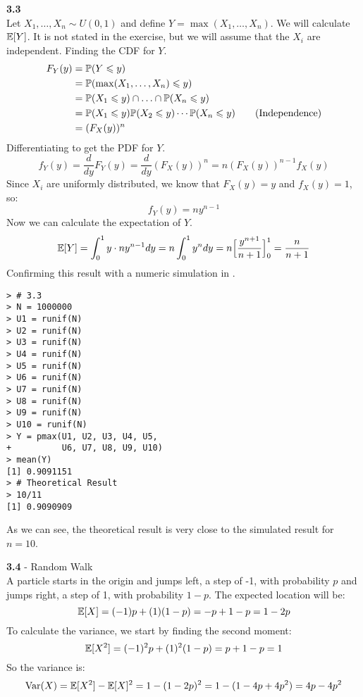 \newpage\noindent
\textbf{3.3}\\  %
Let $X_1,\ldots, X_n\sim U(0,1)$ and define $Y = \max(X_1,\ldots, X_n)$. We will calculate
$\E[Y]$. It is not stated in the exercise, but we will assume that the $X_i$ are independent.
Finding the CDF for $Y$.
\begin{align*}
    F_Y(y) &= \P(Y\leq y) \\
    &= \P(\max(X_1, \ldots, X_n) \leq y) \\
    &= \P(X_1\leq y)\cap\ldots\cap\P(X_n\leq y) \\
    &= \P(X_1\leq y)\P(X_2\leq y)\cdots\P(X_n\leq y) \tag{Independence}\\
    &= (F_X(y))^n
\end{align*}
Differentiating to get the PDF for $Y$.
$$
f_Y(y) = \frac{d}{dy}F_Y(y) = \frac{d}{dy}(F_X(y))^n = n(F_X(y))^{n-1}f_X(y)
$$
Since $X_i$ are uniformly distributed, we know that $F_X(y) = y$ and $f_X(y) = 1$, so:
$$
f_Y(y) = ny^{n-1}
$$
Now we can calculate the expectation of $Y$.
$$
\E[Y] = \int_0^1 y\cdot ny^{n-1} dy = n\int_0^1 y^n dy = n\Big[\frac{y^{n+1}}{n+1}\Big]_0^1 = \frac{n}{n+1}
$$
Confirming this result with a numeric simulation in \RR.

\begin{lstlisting}[style=RSyntax, title=R]
> # 3.3
> N = 1000000
> U1 = runif(N)
> U2 = runif(N)
> U3 = runif(N)
> U4 = runif(N)
> U5 = runif(N)
> U6 = runif(N)
> U7 = runif(N)
> U8 = runif(N)
> U9 = runif(N)
> U10 = runif(N)
> Y = pmax(U1, U2, U3, U4, U5,
+          U6, U7, U8, U9, U10)
> mean(Y)
[1] 0.9091151
> # Theoretical Result
> 10/11
[1] 0.9090909
\end{lstlisting}
As we can see, the theoretical result is very close to the simulated result for $n=10$.

\newpage\noindent
\textbf{3.4} - Random Walk\\  %
A particle starts in the origin and jumps left, a step of -1, with probability $p$
and jumps right, a step of 1, with probability $1-p$. The expected location will be:
$$
\E[X] = (-1)p + (1)(1-p) = -p + 1 - p = 1 - 2p
$$
To calculate the variance, we start by finding the second moment:
$$
\E[X^2] = (-1)^2p + (1)^2(1-p) = p + 1 - p = 1
$$
So the variance is:
$$
\V(X) = \E[X^2] - \E[X]^2 = 1 - (1 - 2p)^2 = 1 -(1 - 4p + 4p^2) = 4p - 4p^2
$$

